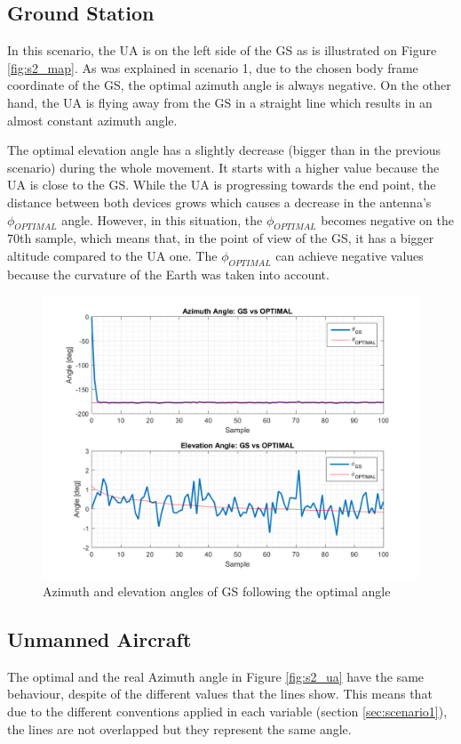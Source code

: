 \subsection{Ground Station}
In this scenario, the UA is on the left side of the GS as is illustrated on Figure \ref{fig:s2_map}. As was explained in scenario 1, due to the chosen body frame coordinate of the GS, the optimal azimuth angle is always negative. On the other hand, the UA is flying away from the GS in a straight line which results in an almost constant azimuth angle. 

The optimal elevation angle has a slightly decrease (bigger than in the previous scenario) during the whole movement. It starts with a higher value because the UA is close to the GS. While the UA is progressing towards the end point, the distance between both devices grows which causes a decrease in the antenna's $\phi_{OPTIMAL}$ angle. However, in this situation, the $\phi_{OPTIMAL}$ becomes negative on the 70th sample, which means that, in the point of view of the GS, it has a bigger altitude compared to the UA one. The $\phi_{OPTIMAL}$ can achieve negative values because the curvature of the Earth was taken into account.

\begin{figure}[H]
	\centering
	\includegraphics[scale=0.75]{figures/s2_gs.png}
	\caption{Azimuth and elevation angles of GS following the optimal angle}
	\label{fig:s2_gs}
\end{figure}

\subsection{Unmanned Aircraft}
The optimal and the real Azimuth angle in Figure \ref{fig:s2_ua} have the same behaviour, despite of the different values that the lines show. This means that due to the different conventions applied in each variable (section \ref{sec:scenario1}), the lines are not overlapped but they represent the same angle.

